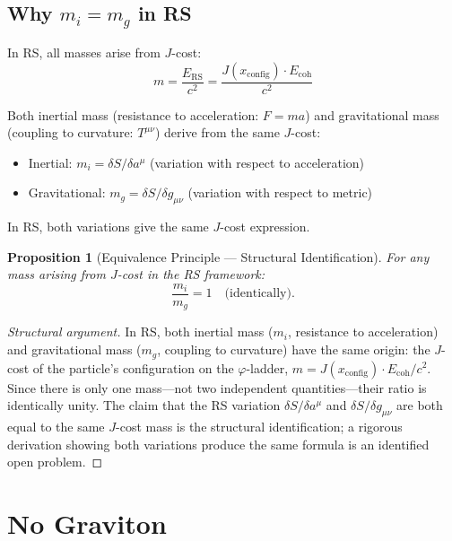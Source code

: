 \documentclass[12pt,a4paper]{article}
\newtheorem{proposition}[theorem]{Proposition}
\theoremstyle{definition}
\theoremstyle{remark}
\begin{document}
\subsection{Why $m_i = m_g$ in RS}

In RS, all masses arise from $J$-cost:
\begin{equation}
m = \frac{E_\mathrm{RS}}{c^2} = \frac{J(x_\mathrm{config}) \cdot E_\mathrm{coh}}{c^2}
\end{equation}

Both inertial mass (resistance to acceleration: $F = ma$) and gravitational mass 
(coupling to curvature: $T^{\mu\nu}$) derive from the same $J$-cost:
\begin{itemize}
\item Inertial: $m_i = \delta S / \delta a^\mu$ (variation with respect to acceleration)
\item Gravitational: $m_g = \delta S / \delta g_{\mu\nu}$ (variation with respect to metric)
\end{itemize}

In RS, both variations give the same $J$-cost expression.

\begin{proposition}[Equivalence Principle --- Structural Identification]
For any mass arising from $J$-cost in the RS framework:
\begin{equation}
\frac{m_i}{m_g} = 1 \quad \text{(identically)}.
\end{equation}
\end{proposition}

\begin{proof}[Structural argument]
In RS, both inertial mass ($m_i$, resistance to acceleration) and gravitational
mass ($m_g$, coupling to curvature) have the same origin: the $J$-cost
of the particle's configuration on the $\varphi$-ladder,
$m = J(x_\mathrm{config})\cdot E_\mathrm{coh}/c^2$.  Since there is only one
mass---not two independent quantities---their ratio is identically unity.  The
claim that the RS variation $\delta S/\delta a^\mu$ and $\delta S/\delta g_{\mu\nu}$
are both equal to the same $J$-cost mass is the structural identification; a
rigorous derivation showing both variations produce the same formula is an
identified open problem.
\end{proof}

\section{No Graviton}
\label{sec:graviton}
\end{document}
